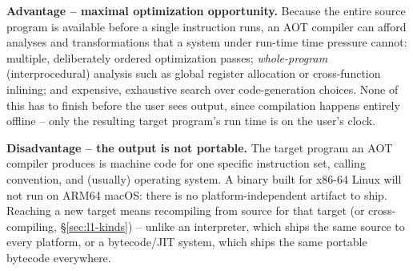 \documentclass[full-course-notes.tex]{subfiles}
\begin{document}
\begin{center}
\end{center}

\textbf{Advantage -- maximal optimization opportunity.} Because the entire source program is
available before a single instruction runs, an AOT compiler can afford analyses and
transformations that a system under run-time time pressure cannot: multiple, deliberately
ordered optimization passes; \emph{whole-program} (interprocedural) analysis such as global
register allocation or cross-function inlining; and expensive, exhaustive search over code-generation
choices. None of this has to finish before the user sees output, since compilation happens
entirely offline -- only the resulting target program's run time is on the user's clock.

\textbf{Disadvantage -- the output is not portable.} The target program an AOT compiler produces
is machine code for one specific instruction set, calling convention, and (usually) operating
system. A binary built for x86-64 Linux will not run on ARM64 macOS: there is no
platform-independent artifact to ship. Reaching a new target means recompiling from source for
that target (or cross-compiling, \S\ref{sec:l1-kinds}) -- unlike an interpreter, which ships the
same source to every platform, or a bytecode/JIT system, which ships the same portable bytecode
everywhere.
\end{document}
